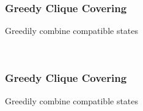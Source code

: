\documentclass{beamer}
\begin{document}
\begin{frame}
\frametitle{Greedy Clique Covering}
Greedily combine compatible states
\begin{figure}
\centering
{}$\quad\phantom{\to}\quad$
\end{figure}
\end{frame}

\begin{frame}
\frametitle{Greedy Clique Covering}
Greedily combine compatible states
\begin{figure}
\centering
{}$\quad\phantom{\to}\quad$
\end{figure}
\end{frame}
\end{document}
